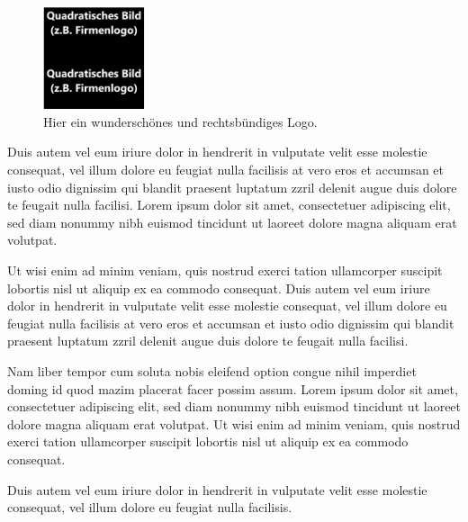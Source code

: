 \begin{figure}
  \begin{center}
        \includegraphics[width=30mm]{images/Quadrat.png}
        \caption{Hier ein wunderschönes und rechtsbündiges Logo.}
        \label{abb:Panther2}
\end{center}
\end{figure}

Duis autem vel eum iriure dolor in hendrerit in vulputate velit esse molestie consequat, vel illum dolore eu feugiat nulla facilisis at vero eros et accumsan et iusto odio dignissim qui blandit praesent luptatum zzril delenit augue duis dolore te feugait nulla facilisi. Lorem ipsum dolor sit amet, consectetuer adipiscing elit, sed diam nonummy nibh euismod tincidunt ut laoreet dolore magna aliquam erat volutpat.   

Ut wisi enim ad minim veniam, quis nostrud exerci tation ullamcorper suscipit lobortis nisl ut aliquip ex ea commodo consequat. Duis autem vel eum iriure dolor in hendrerit in vulputate velit esse molestie consequat, vel illum dolore eu feugiat nulla facilisis at vero eros et accumsan et iusto odio dignissim qui blandit praesent luptatum zzril delenit augue duis dolore te feugait nulla facilisi.   

Nam liber tempor cum soluta nobis eleifend option congue nihil imperdiet doming id quod mazim placerat facer possim assum. Lorem ipsum dolor sit amet, consectetuer adipiscing elit, sed diam nonummy nibh euismod tincidunt ut laoreet dolore magna aliquam erat volutpat. Ut wisi enim ad minim veniam, quis nostrud exerci tation ullamcorper suscipit lobortis nisl ut aliquip ex ea commodo consequat.   

Duis autem vel eum iriure dolor in hendrerit in vulputate velit esse molestie consequat, vel illum dolore eu feugiat nulla facilisis.     